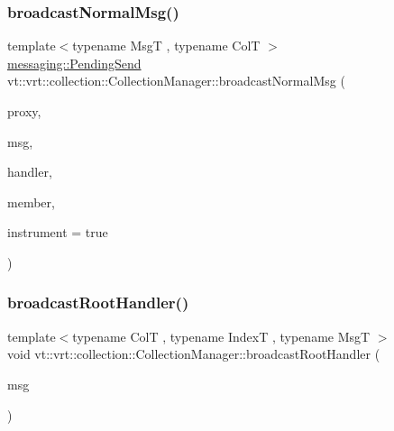 \subsubsection{\texorpdfstring{broadcast\+Normal\+Msg()}{broadcastNormalMsg()}}
{\footnotesize\ttfamily template$<$typename MsgT , typename ColT $>$ \\
\hyperlink{structvt_1_1messaging_1_1_pending_send}{messaging\+::\+Pending\+Send} vt\+::vrt\+::collection\+::\+Collection\+Manager\+::broadcast\+Normal\+Msg (\begin{DoxyParamCaption}\item[{\hyperlink{structvt_1_1vrt_1_1collection_1_1_collection_manager_a56458ed7f9bb22b631b9b3a745f42f94}{Collection\+Proxy\+Wrap\+Type}$<$ ColT $>$ const \&}]{proxy,  }\item[{MsgT $\ast$}]{msg,  }\item[{\hyperlink{namespacevt_af64846b57dfcaf104da3ef6967917573}{Handler\+Type} const \&}]{handler,  }\item[{bool const}]{member,  }\item[{bool}]{instrument = {\ttfamily true} }\end{DoxyParamCaption})}

\mbox{\label{structvt_1_1vrt_1_1collection_1_1_collection_manager_a9859d8346c9aac1fb0b65e6db82969db}} 
\subsubsection{\texorpdfstring{broadcast\+Root\+Handler()}{broadcastRootHandler()}}
{\footnotesize\ttfamily template$<$typename ColT , typename IndexT , typename MsgT $>$ \\
void vt\+::vrt\+::collection\+::\+Collection\+Manager\+::broadcast\+Root\+Handler (\begin{DoxyParamCaption}\item[{MsgT $\ast$}]{msg }\end{DoxyParamCaption})\hspace{0.3cm}{\ttfamily [static]}}

\mbox{\label{structvt_1_1vrt_1_1collection_1_1_collection_manager_af3771d408c2ef15e65b9ba8219aa830a}} 
